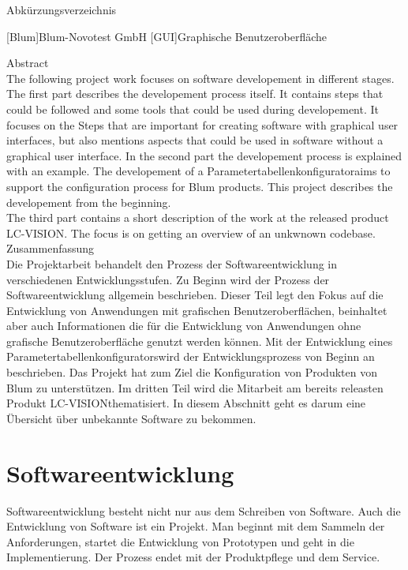 \documentclass[12pt,a4paper]{article}
\begin{document}
\newpage
\tableofcontents
\thispagestyle{empty}
\newpage
\onehalfspacing
\noindent
\thispagestyle{empty}
{\Large Abkürzungsverzeichnis}\\
\newline
\begin{acronym}[Abkürzungsverzeichnis]
[Blum]{Blum-Novotest GmbH}
[GUI]{Graphische Benutzeroberfläche}
\end{acronym}
\newpage
\thispagestyle{empty}
\listoffigures
\newpage\setcounter{page}{1}\noindent
{\Large Abstract}\\\noindent
The following project work focuses on software developement in different stages. The first part describes the developement process itself. It contains steps that could be followed and some tools that could be used during developement. It focuses on the Steps that are important for creating software with graphical user interfaces, but also mentions aspects that could be used in software without a graphical user interface. In the second part the developement process is explained with an example. The developement of a \glqq Parametertabellenkonfigurator\grqq\space aims to support the configuration process for \ac{Blum} products. This project describes the developement from the beginning. \\
The third part contains a short description of the work at the released product \glqq LC-VISION\grqq. The focus is on getting an overview of an unkwnown codebase.\\\newline
\noindent
{\Large Zusammenfassung}\\
\noindent
Die Projektarbeit behandelt den Prozess der Softwareentwicklung in verschiedenen Entwicklungsstufen. Zu Beginn wird der Prozess der Softwareentwicklung allgemein beschrieben. Dieser Teil legt den Fokus auf die Entwicklung von Anwendungen mit grafischen Benutzeroberflächen, beinhaltet aber auch Informationen die für die Entwicklung von Anwendungen ohne grafische Benutzeroberfläche genutzt werden können. Mit der Entwicklung eines \glqq Parametertabellenkonfigurators\grqq\space wird der Entwicklungsprozess von Beginn an beschrieben. Das Projekt hat zum Ziel die Konfiguration von Produkten von \ac{Blum} zu unterstützen. Im dritten Teil wird die Mitarbeit am bereits releasten Produkt \glqq LC-VISION\grqq\space thematisiert. In diesem Abschnitt geht es darum eine Übersicht über unbekannte Software zu bekommen.

\newpage   
\section{Softwareentwicklung}
Softwareentwicklung besteht nicht nur aus dem Schreiben von Software. Auch die Entwicklung von Software ist ein Projekt. Man beginnt mit dem Sammeln der Anforderungen, startet die Entwicklung von Prototypen und geht in die Implementierung. Der Prozess endet mit der Produktpflege und dem Service.  
\end{document}
